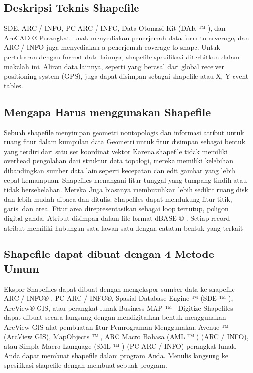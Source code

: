 \subsection{Deskripsi Teknis Shapefile}
SDE, ARC / INFO, PC ARC / INFO, Data Otomasi Kit (DAK ™ ), dan ArcCAD ® 
Perangkat lunak menyediakan penerjemah data form-to-coverage, dan ARC / INFO juga menyediakan a 
penerjemah coverage-to-shape. Untuk pertukaran dengan format data lainnya, shapefile 
spesifikasi diterbitkan dalam makalah ini. Aliran data lainnya, seperti yang berasal dari global 
receiver positioning system (GPS), juga dapat disimpan sebagai shapefile atau X, Y event tables. 

\subsection{Mengapa Harus menggunakan Shapefile}
Sebuah shapefile menyimpan geometri nontopologis dan informasi atribut untuk ruang 
fitur dalam kumpulan data Geometri untuk fitur disimpan sebagai bentuk yang terdiri dari satu set 
koordinat vektor 
Karena shapefile tidak memiliki overhead pengolahan dari struktur data topologi, 
mereka memiliki kelebihan dibandingkan sumber data lain seperti kecepatan dan edit gambar yang lebih cepat 
kemampuan. Shapefiles menangani fitur tunggal yang tumpang tindih atau tidak bersebelahan. Mereka 
Juga biasanya membutuhkan lebih sedikit ruang disk dan lebih mudah dibaca dan ditulis. 
Shapefiles dapat mendukung fitur titik, garis, dan area. Fitur area direpresentasikan sebagai 
loop tertutup, poligon digital ganda. Atribut disimpan dalam file format dBASE ® . 
Setiap record atribut memiliki hubungan satu lawan satu dengan catatan bentuk yang terkait

\subsection{Shapefile dapat dibuat dengan 4 Metode Umum}
Ekspor Shapefiles dapat dibuat dengan mengekspor sumber data ke shapefile
ARC / INFO® , PC ARC / INFO®, Spasial Database Engine ™ (SDE ™ ), ArcView® GIS,
atau perangkat lunak Business MAP ™ .
Digitize Shapefiles dapat dibuat secara langsung dengan mendigitalkan bentuk menggunakan ArcView GIS
alat pembuatan fitur
Pemrograman Menggunakan Avenue ™ (ArcView GIS), MapObjects ™ , ARC Macro
Bahasa (AML ™ ) (ARC / INFO), atau Simple Macro Language (SML ™ )
(PC ARC / INFO) perangkat lunak, Anda dapat membuat shapefile dalam program Anda.
Menulis langsung ke spesifikasi shapefile dengan membuat sebuah program. 

